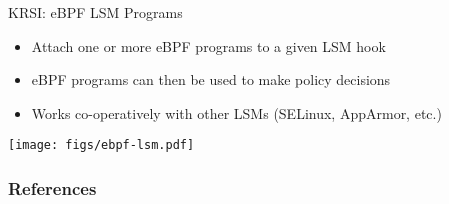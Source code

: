 \documentclass[12pt, dvipsnames, aspectratio=169]{beamer}
\begin{document}
\begin{frame}[c]{KRSI: eBPF LSM Programs}
\begin{itemize}
  \item Attach one or more eBPF programs to a given LSM hook
  \item eBPF programs can then be used to make policy decisions
  \item Works co-operatively with other LSMs (SELinux, AppArmor, etc.)
\end{itemize}
\vfill
\begin{center}
  \color{black}
  \texttt{[image: figs/ebpf-lsm.pdf]}
\end{center}
\end{frame}

\begin{frame}
        \frametitle{References}
        \printbibliography
\end{frame}
\end{document}
